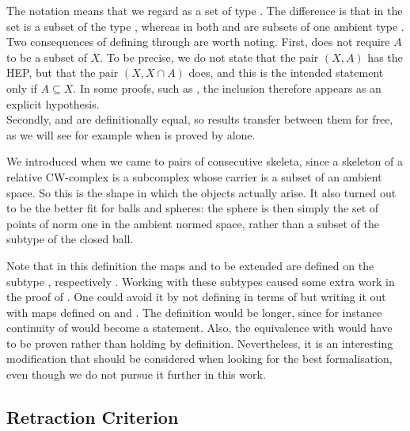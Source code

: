 \documentclass[11pt, a4paper, english]{article}
\theoremstyle{plain}
\theoremstyle{definition}
\theoremstyle{remark}
\numberwithin{equation}{section}
\numberwithin{theorem}{section}
\begin{document}
The notation  means that we regard  as a set of type . The difference is that in  the set  is a subset of the type , whereas in  both  and  are subsets of one ambient type .\\
Two consequences of defining  through  are worth noting. First,  does not require $A$ to be a subset of $X$. To be precise, we do not state that the pair $(X,A)$ has the HEP, but that the pair $(X, X \cap A)$ does, and this is the intended statement only if $A \subseteq X$. In some proofs, such as , the inclusion therefore appears as an explicit hypothesis.\\ %
Secondly,  and  are definitionally equal, so results transfer between them for free, as we will see for example when  is proved by  alone.

We introduced  when we came to pairs of consecutive skeleta, since a skeleton of a relative CW-complex is a subcomplex whose carrier is a subset of an ambient space. So this is the shape in which the objects actually arise. It also turned out to be the better fit for balls and spheres: the sphere is then simply the set of points of norm one in the ambient normed space, rather than a subset of the subtype of the closed ball. 

Note that in this definition the maps  and  to be extended are defined on the subtype , respectively . Working with these subtypes caused some extra work in the proof of . One could avoid it by not defining  in terms of  but writing it out with maps defined on  and . The definition would be longer, since for instance continuity of  would become a  statement. Also, the equivalence with  would have to be proven rather than holding by definition. Nevertheless, it is an interesting modification that should be considered when looking for the best formalisation, even though we do not pursue it further in this work. \\

\subsection{Retraction Criterion} \label{subsec:lean:retractioncriterion}
\end{document}
